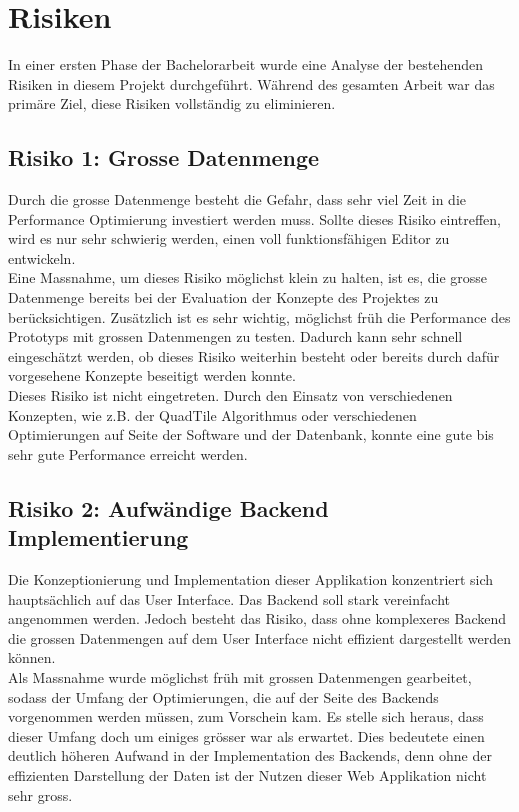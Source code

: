 \section{Risiken}
In einer ersten Phase der Bachelorarbeit wurde eine Analyse der bestehenden Risiken in diesem Projekt durchgeführt. Während des gesamten Arbeit war das primäre Ziel, diese Risiken vollständig zu eliminieren.
\subsection*{Risiko 1: Grosse Datenmenge}
Durch die grosse Datenmenge besteht die Gefahr, dass sehr viel Zeit in die Performance Optimierung investiert werden muss. Sollte dieses Risiko eintreffen, wird es nur sehr schwierig werden, einen voll funktionsfähigen Editor zu entwickeln.\\
Eine Massnahme, um dieses Risiko möglichst klein zu halten, ist es, die grosse Datenmenge bereits bei der Evaluation der Konzepte des Projektes zu berücksichtigen. Zusätzlich ist es sehr wichtig, möglichst früh die Performance des Prototyps mit grossen Datenmengen zu testen. Dadurch kann sehr schnell eingeschätzt werden, ob dieses Risiko weiterhin besteht oder bereits durch dafür vorgesehene Konzepte beseitigt werden konnte.\\
Dieses Risiko ist nicht eingetreten. Durch den Einsatz von verschiedenen Konzepten, wie z.B. der QuadTile Algorithmus \cite{OSMQuadTiles} oder verschiedenen Optimierungen auf Seite der Software und der Datenbank, konnte eine gute bis sehr gute Performance erreicht werden.
\subsection*{Risiko 2: Aufwändige Backend Implementierung}
Die Konzeptionierung und Implementation dieser Applikation konzentriert sich hauptsächlich auf das User Interface. Das Backend soll stark vereinfacht angenommen werden. Jedoch besteht das Risiko, dass ohne komplexeres Backend die grossen Datenmengen auf dem User Interface nicht effizient dargestellt werden können.\\
Als Massnahme wurde möglichst früh mit grossen Datenmengen gearbeitet, sodass der Umfang der Optimierungen, die auf der Seite des Backends vorgenommen werden müssen, zum Vorschein kam. Es stelle sich heraus, dass dieser Umfang  doch um einiges grösser war als erwartet. Dies bedeutete einen deutlich höheren Aufwand in der Implementation des Backends, denn ohne der effizienten Darstellung der Daten ist der Nutzen dieser Web Applikation nicht sehr gross.